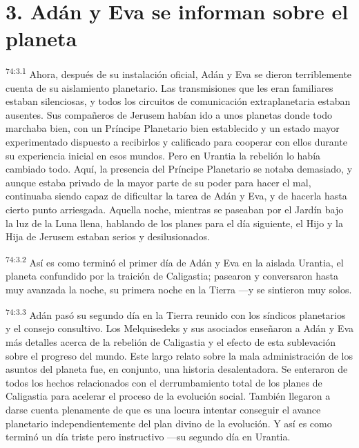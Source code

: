 \section*{3. Adán y Eva se informan sobre el planeta}
\par
\textsuperscript{74:3.1} Ahora, después de su instalación oficial, Adán y Eva se dieron terriblemente cuenta de su aislamiento planetario. Las transmisiones que les eran familiares estaban silenciosas, y todos los circuitos de comunicación extraplanetaria estaban ausentes. Sus compañeros de Jerusem habían ido a unos planetas donde todo marchaba bien, con un Príncipe Planetario bien establecido y un estado mayor experimentado dispuesto a recibirlos y calificado para cooperar con ellos durante su experiencia inicial en esos mundos. Pero en Urantia la rebelión lo había cambiado todo. Aquí, la presencia del Príncipe Planetario se notaba demasiado, y aunque estaba privado de la mayor parte de su poder para hacer el mal, continuaba siendo capaz de dificultar la tarea de Adán y Eva, y de hacerla hasta cierto punto arriesgada. Aquella noche, mientras se paseaban por el Jardín bajo la luz de la Luna llena, hablando de los planes para el día siguiente, el Hijo y la Hija de Jerusem estaban serios y desilusionados.

\par
\textsuperscript{74:3.2} Así es como terminó el primer día de Adán y Eva en la aislada Urantia, el planeta confundido por la traición de Caligastia; pasearon y conversaron hasta muy avanzada la noche, su primera noche en la Tierra ---y se sintieron muy solos.

\par
\textsuperscript{74:3.3} Adán pasó su segundo día en la Tierra reunido con los síndicos planetarios y el consejo consultivo. Los Melquisedeks y sus asociados enseñaron a Adán y Eva más detalles acerca de la rebelión de Caligastia y el efecto de esta sublevación sobre el progreso del mundo. Este largo relato sobre la mala administración de los asuntos del planeta fue, en conjunto, una historia desalentadora. Se enteraron de todos los hechos relacionados con el derrumbamiento total de los planes de Caligastia para acelerar el proceso de la evolución social. También llegaron a darse cuenta plenamente de que es una locura intentar conseguir el avance planetario independientemente del plan divino de la evolución. Y así es como terminó un día triste pero instructivo ---su segundo día en Urantia.

